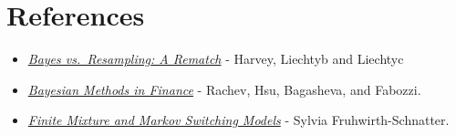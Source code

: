 \documentclass[
]{article}
\providecommand{\tightlist}{%
  \setlength{\itemsep}{0pt}\setlength{\parskip}{0pt}}
\begin{document}
\hypertarget{references}{%
\section{References}\label{references}}

\begin{itemize}
\tightlist
\item
  \href{https://faculty.fuqua.duke.edu/~charvey/Research/Published_Papers/P95_Bayes_vs_Markowitz.pdf}{\emph{Bayes
  vs.~Resampling: A Rematch}} - Harvey, Liechtyb and Liechtyc
\item
  \href{https://www.wiley.com/en-us/Bayesian+Methods+in+Finance-p-9780470249246}{\emph{Bayesian
  Methods in Finance}} - Rachev, Hsu, Bagasheva, and Fabozzi.
\item
  \href{https://link.springer.com/content/pdf/10.1007\%2F978-0-387-35768-3.pdf}{\emph{Finite
  Mixture and Markov Switching Models}} - Sylvia Fruhwirth-Schnatter.
\end{itemize}
\end{document}
